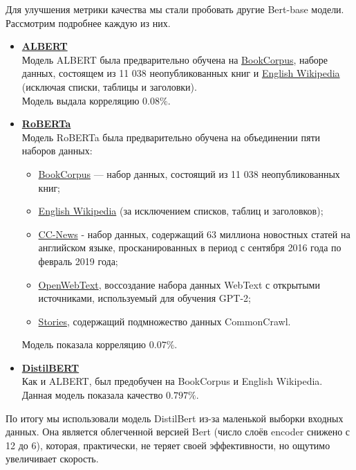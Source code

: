 \documentclass[12pt]{article}
\begin{document}
Для улучшения метрики качества мы стали пробовать другие Bert-base модели. Рассмотрим подробнее каждую из них.
\begin{itemize}
    \item \href{https://huggingface.co/albert-base-v2}{\textbf{ALBERT}} \\
    Модель ALBERT была предварительно обучена на \href{https://yknzhu.wixsite.com/mbweb}{BookCorpus}, наборе данных, состоящем из 11 038 неопубликованных книг и \href{https://en.wikipedia.org/wiki/English_Wikipedia}{English Wikipedia} (исключая списки, таблицы и заголовки). \\
    Модель выдала корреляцию $0.08\%$.

    \item \href{https://huggingface.co/roberta-base}{\textbf{RoBERTa}} \\
    Модель RoBERTa была предварительно обучена на объединении пяти наборов данных:
    \begin{itemize}
        \item \href{https://yknzhu.wixsite.com/mbweb}{BookCorpus} — набор данных, состоящий из 11 038 неопубликованных книг;
        \item \href{https://en.wikipedia.org/wiki/English_Wikipedia}{English Wikipedia} (за исключением списков, таблиц и заголовков);
        \item \href{https://commoncrawl.org/2016/10/news-dataset-available/}{CC-News} - набор данных, содержащий 63 миллиона новостных статей на английском языке, просканированных в период с сентября 2016 года по февраль 2019 года;
        \item \href{https://github.com/jcpeterson/openwebtext}{OpenWebText}, воссоздание набора данных WebText с открытыми источниками, используемый для обучения GPT-2;
        \item \href{https://arxiv.org/abs/1806.02847}{Stories}, содержащий подмножество данных CommonCrawl.
    \end{itemize}
    Модель показала корреляцию $0.07\%$.

    \item \href{https://huggingface.co/distilbert-base-uncased}{\textbf{DistilBERT}} \\
    Как и ALBERT, был предобучен на BookCorpus и English Wikipedia. \\
    Данная модель показала качество $0.797\%$.
\end{itemize}

По итогу мы использовали модель DistilBert из-за маленькой выборки входных данных. Она является облегченной версией Bert (число слоёв encoder снижено с 12 до 6), которая, практически, не теряет своей эффективности, но ощутимо увеличивает скорость. 
\end{document}
